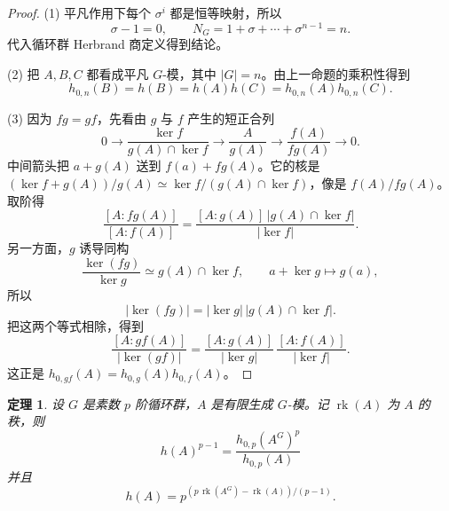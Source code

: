 \documentclass[11pt,a4paper,openany]{ctexbook}
\numberwithin{equation}{chapter}
\theoremstyle{plain}
\newtheorem{theorem}{定理}[chapter]
\theoremstyle{definition}
\theoremstyle{remark}
\begin{document}
\begin{proof}
(1) 平凡作用下每个 $\sigma^i$ 都是恒等映射，所以
\[
\sigma-1=0,\qquad N_G=1+\sigma+\cdots+\sigma^{n-1}=n.
\]
代入循环群 Herbrand 商定义得到结论。

(2) 把 $A,B,C$ 都看成平凡 $G$-模，其中 $|G|=n$。由上一命题的乘积性得到
\[
h_{0,n}(B)=h(B)=h(A)h(C)=h_{0,n}(A)h_{0,n}(C).
\]

(3) 因为 $fg=gf$，先看由 $g$ 与 $f$ 产生的短正合列
\[
0\to \frac{\ker f}{g(A)\cap\ker f}
\to \frac{A}{g(A)}
\to \frac{f(A)}{fg(A)}
\to 0.
\]
中间箭头把 $a+g(A)$ 送到 $f(a)+fg(A)$。它的核是
$(\ker f+g(A))/g(A)\simeq \ker f/(g(A)\cap\ker f)$，像是 $f(A)/fg(A)$。
取阶得
\[
\frac{[A:fg(A)]}{[A:f(A)]}
=\frac{[A:g(A)]\,|g(A)\cap\ker f|}{|\ker f|}.
\]
另一方面，$g$ 诱导同构
\[
\frac{\ker(fg)}{\ker g}\simeq g(A)\cap\ker f,
\qquad a+\ker g\mapsto g(a),
\]
所以
\[
|\ker(fg)|=|\ker g|\,|g(A)\cap\ker f|.
\]
把这两个等式相除，得到
\[
 \frac{[A:gf(A)]}{|\ker(gf)|}
 =
 \frac{[A:g(A)]}{|\ker g|}\,
 \frac{[A:f(A)]}{|\ker f|}.
\]
这正是 $h_{0,gf}(A)=h_{0,g}(A)h_{0,f}(A)$。
\end{proof}

\begin{theorem}
设 $G$ 是素数 $p$ 阶循环群，$A$ 是有限生成 $G$-模。记 $\operatorname{rk}(A)$ 为 $A$ 的秩，则
\[
 h(A)^{p-1}=\frac{h_{0,p}(A^G)^p}{h_{0,p}(A)}
\]
并且
\[
 h(A)=p^{(p\,\operatorname{rk}(A^G)-\operatorname{rk}(A))/(p-1)}.
\]
\end{theorem}
\end{document}
